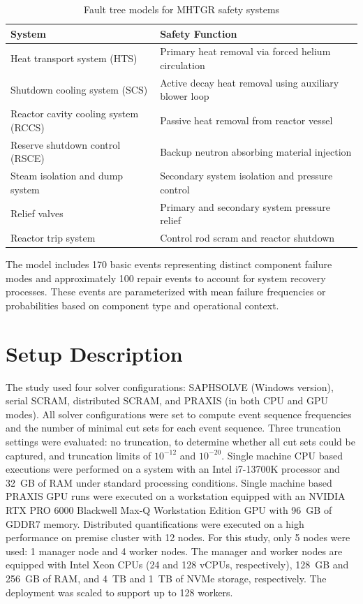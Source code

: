 \begin{table}[]
\centering
\caption{Fault tree models for MHTGR safety systems}
\label{tab:fault-tree-systems}
\begin{tabularx}{\textwidth}{l >{\RaggedRight\arraybackslash}X}
\toprule
\textbf{System} & \textbf{Safety Function} \\
\midrule
Heat transport system (HTS) & Primary heat removal via forced helium circulation \\
Shutdown cooling system (SCS) & Active decay heat removal using auxiliary blower loop \\
Reactor cavity cooling system (RCCS) & Passive heat removal from reactor vessel \\
Reserve shutdown control (RSCE) & Backup neutron absorbing material injection \\
Steam isolation and dump system & Secondary system isolation and pressure control \\
Relief valves & Primary and secondary system pressure relief \\
Reactor trip system & Control rod scram and reactor shutdown \\
\bottomrule
\end{tabularx}
\end{table}

The model includes 170 basic events representing distinct component failure modes and approximately 100 repair events to account for system recovery processes. These events are parameterized with mean failure frequencies or probabilities based on component type and operational context.

\section{Setup Description}
The study used four solver configurations: SAPHSOLVE (Windows version), serial SCRAM, distributed SCRAM, and PRAXIS (in both CPU and GPU modes). All solver configurations were set to compute event sequence frequencies and the number of minimal cut sets for each event sequence. Three truncation settings were evaluated: no truncation, to determine whether all cut sets could be captured, and truncation limits of $10^{-12}$ and $10^{-20}$. Single machine CPU based executions were performed on a system with an Intel i7-13700K processor and 32~GB of RAM under standard processing conditions. Single machine based PRAXIS GPU runs were executed on a workstation equipped with an NVIDIA RTX PRO 6000 Blackwell Max-Q Workstation Edition GPU with 96~GB of GDDR7 memory. Distributed quantifications were executed on a high performance on premise cluster with 12 nodes. For this study, only 5 nodes were used: 1 manager node and 4 worker nodes. The manager and worker nodes are equipped with Intel Xeon CPUs (24 and 128 vCPUs, respectively), 128~GB and 256~GB of RAM, and 4~TB and 1~TB of NVMe storage, respectively. The deployment was scaled to support up to 128 workers.

